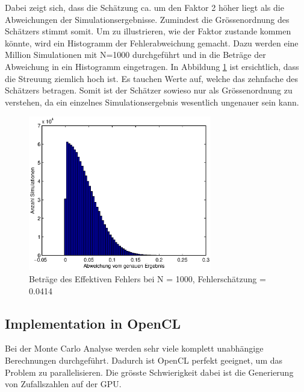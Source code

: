 \documentclass{book}
\begin{document}
\begin{refsection}
Dabei zeigt sich, dass die Schätzung ca. um den Faktor 2 höher liegt als die Abweichungen der Simulationsergebnisse. Zumindest die Grössenordnung des Schätzers stimmt somit. Um zu illustrieren, wie der Faktor zustande kommen könnte, wird ein Histogramm der Fehlerabweichung gemacht. Dazu werden eine Million Simulationen mit N=1000 durchgeführt und in die Beträge der Abweichung in ein Histogramm eingetragen. In Abbildung \ref{fig:Histogramm} ist ersichtlich, dass die Streuung ziemlich hoch ist. Es tauchen Werte auf, welche das zehnfache des Schätzers betragen. Somit ist der Schätzer sowieso nur als Grössenordnung zu verstehen, da ein einzelnes Simulationsergebnis wesentlich ungenauer sein kann.


\begin{figure}[ht!]
    \centering
    \includegraphics[width=8cm]{images/Histogramm.eps}
    \caption{Beträge des Effektiven Fehlers bei N = 1000, Fehlerschätzung = 0.0414}
    \label{fig:Histogramm}
\end{figure}


\subsection{Implementation in OpenCL}
Bei der Monte Carlo Analyse werden sehr viele komplett unabhängige Berechnungen durchgeführt. Dadurch ist OpenCL perfekt geeignet, um das Problem zu parallelisieren. Die grösste Schwierigkeit dabei ist die Generierung von Zufallszahlen auf der GPU. 


\end{refsection}
\end{document}
